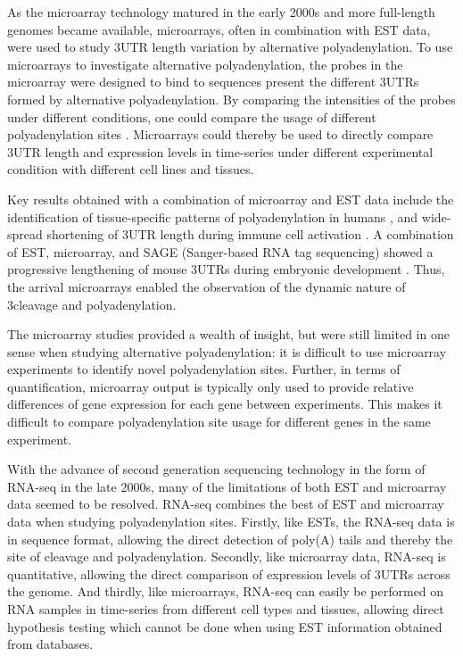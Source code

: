 As the microarray technology matured in the early 2000s and more full-length
genomes became available, microarrays, often in combination with EST data, were
used to study 3\ppp UTR length variation by alternative polyadenylation. To
use microarrays to investigate alternative polyadenylation, the probes in the
microarray were designed to bind to sequences present the different 3\ppp UTRs
formed by alternative polyadenylation. By comparing the intensities of the
probes under different conditions, one could compare the usage of different
polyadenylation sites \cite{sandberg_proliferating_2008, ji_progressive_2009}.
Microarrays could thereby be used to directly compare 3\ppp UTR length and
expression levels in time-series under different experimental condition with
different cell lines and tissues.

Key results obtained with a combination of microarray and EST data include the
identification of tissue-specific patterns of polyadenylation in humans
\cite{zhang_biased_2005}, and wide-spread shortening of 3\ppp UTR length during
immune cell activation \cite{sandberg_proliferating_2008}. A combination of
EST, microarray, and SAGE (Sanger-based RNA tag sequencing) showed a
progressive lengthening of mouse 3\ppp UTRs during embryonic development
\cite{ji_progressive_2009}. Thus, the arrival microarrays enabled the
observation of the dynamic nature of 3\ppp cleavage and polyadenylation.

The microarray studies provided a wealth of insight, but were still limited in
one sense when studying alternative polyadenylation: it is difficult to
use microarray experiments to identify novel polyadenylation sites. Further, in
terms of quantification, microarray output is typically only used to provide
relative differences of gene expression for each gene between experiments. This
makes it difficult to compare polyadenylation site usage for different genes in
the same experiment.

With the advance of second generation sequencing technology in the form of
RNA-seq in the late 2000s, many of the limitations of both EST and microarray
data seemed to be resolved. RNA-seq combines the best of EST and microarray
data when studying polyadenylation sites. Firstly, like ESTs, the RNA-seq data
is in sequence format, allowing the direct detection of poly(A) tails and
thereby the site of cleavage and polyadenylation. Secondly, like microarray
data, RNA-seq is quantitative, allowing the direct comparison of expression
levels of 3\ppp UTRs across the genome. And thirdly, like microarrays, RNA-seq
can easily be performed on RNA samples in time-series from different cell types
and tissues, allowing direct hypothesis testing which cannot be done when using
EST information obtained from databases. 

